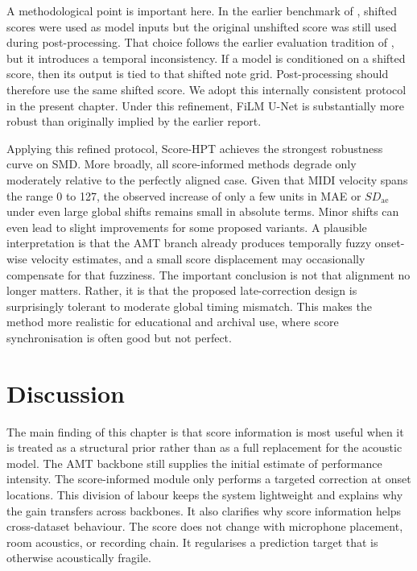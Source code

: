A methodological point is important here. In the earlier benchmark of \cite{kim2024method}, shifted scores were used as model inputs but the original unshifted score was still used during post-processing. That choice follows the earlier evaluation tradition of \cite{kim2023score}, but it introduces a temporal inconsistency. If a model is conditioned on a shifted score, then its output is tied to that shifted note grid. Post-processing should therefore use the same shifted score. We adopt this internally consistent protocol in the present chapter. Under this refinement, FiLM U-Net is substantially more robust than originally implied by the earlier report.

Applying this refined protocol, Score-HPT achieves the strongest robustness curve on SMD. More broadly, all score-informed methods degrade only moderately relative to the perfectly aligned case. Given that MIDI velocity spans the range 0 to 127, the observed increase of only a few units in MAE or \(SD_{\mathrm{ae}}\) under even large global shifts remains small in absolute terms. Minor shifts can even lead to slight improvements for some proposed variants. A plausible interpretation is that the AMT branch already produces temporally fuzzy onset-wise velocity estimates, and a small score displacement may occasionally compensate for that fuzziness. The important conclusion is not that alignment no longer matters. Rather, it is that the proposed late-correction design is surprisingly tolerant to moderate global timing mismatch. This makes the method more realistic for educational and archival use, where score synchronisation is often good but not perfect.

\section{Discussion}
\label{sec:scoreinf:discussion}

The main finding of this chapter is that score information is most useful when it is treated as a structural prior rather than as a full replacement for the acoustic model. The AMT backbone still supplies the initial estimate of performance intensity. The score-informed module only performs a targeted correction at onset locations. This division of labour keeps the system lightweight and explains why the gain transfers across backbones. It also clarifies why score information helps cross-dataset behaviour. The score does not change with microphone placement, room acoustics, or recording chain. It regularises a prediction target that is otherwise acoustically fragile.

